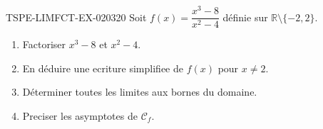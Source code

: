 \begin{exercice}{TSPE-LIMFCT-EX-020}{3}{20}
Soit $f(x) = \dfrac{x^3 - 8}{x^2 - 4}$ définie sur $\mathbb{R} \setminus \{-2, 2\}$.
\begin{enumerate}
  \item Factoriser $x^3 - 8$ et $x^2 - 4$.
  \item En déduire une ecriture simplifiee de $f(x)$ pour $x
\neq 2$.
  \item Déterminer toutes les limites aux bornes du domaine.
  \item Preciser les asymptotes de $\mathcal{C}_f$.
\end{enumerate}
\end{exercice}
